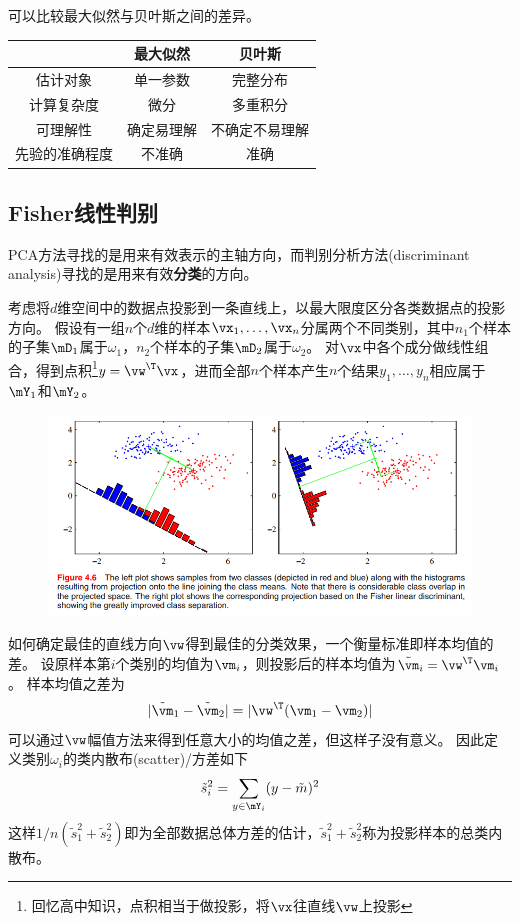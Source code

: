 可以比较最大似然与贝叶斯之间的差异。
\begin{center}
\begin{tabular}{|c|c|c|}\hline
 & 最大似然 & 贝叶斯\\\hline
估计对象 & 单一参数 & 完整分布\\\hline
计算复杂度 & 微分 & 多重积分\\\hline
可理解性 & 确定易理解 & 不确定不易理解\\\hline
先验的准确程度 & 不准确 & 准确\\\hline
\end{tabular}
\end{center}


\subsection{Fisher线性判别}
PCA方法寻找的是用来有效表示的主轴方向，而判别分析方法(discriminant analysis)寻找的是用来有效\textbf{分类}的方向。

考虑将$d$维空间中的数据点投影到一条直线上，以最大限度区分各类数据点的投影方向。
假设有一组$n$个$d$维的样本$\vx_1,\ldots,\vx_n$分属两个不同类别，其中$n_1$个样本的子集$\mD_1$属于$\omega_1$，$n_2$个样本的子集$\mD_2$属于$\omega_2$。
对$\vx$中各个成分做线性组合，得到点积\footnote{回忆高中知识，点积相当于做投影，将$\vx$往直线$\vw$上投影}$y=\vw^\T\vx$，进而全部$n$个样本产生$n$个结果$y_1,\ldots,y_n$相应属于$\mY_1$和$\mY_2$。
\begin{figure}[H]
\centering
\includegraphics[width=0.8\linewidth]{fig/Fisher.png}
\end{figure}

如何确定最佳的直线方向$\vw$得到最佳的分类效果，一个衡量标准即样本均值的差。
设原样本第$i$个类别的均值为$\vm_i$，则投影后的样本均值为$\tilde{\vm}_i=\vw^\T\vm_i$。
样本均值之差为
\[|\tilde{\vm}_1-\tilde{\vm}_2|=|\vw^\T(\vm_1-\vm_2)|\]
可以通过$\vw$幅值方法来得到任意大小的均值之差，但这样子没有意义。
因此定义类别$\omega_i$的类内散布(scatter)/方差如下
\[\tilde{s}_i^2=\sum_{y\in\mY_i}(y-\tilde{m})^2\]
这样$1/n(\tilde{s}_1^2+\tilde{s}_2^2)$即为全部数据总体方差的估计，$\tilde{s}_1^2+\tilde{s}_2^2$称为投影样本的总类内散布。

